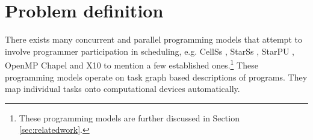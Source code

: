 \documentclass[preprint,10pt,numbers]{sigplanconf}
\begin{document}



  \section{Problem definition}\label{sec:problemdefinition}
There exists many concurrent and parallel programming models that attempt to involve programmer participation in scheduling, e.g. CellSs \cite{Bellens2009}, StarSs \cite{Planas2009}, StarPU \cite{Augonnet2011}, OpenMP \cite{Openmp2013} Chapel \cite{Chapel2012} and X10 \cite{X102015} to mention a few established ones.\footnote{These programming models are further discussed in Section \ref{sec:relatedwork}.}
These programming models operate on task graph based descriptions of programs. They map individual tasks onto computational devices automatically.
\end{document}
